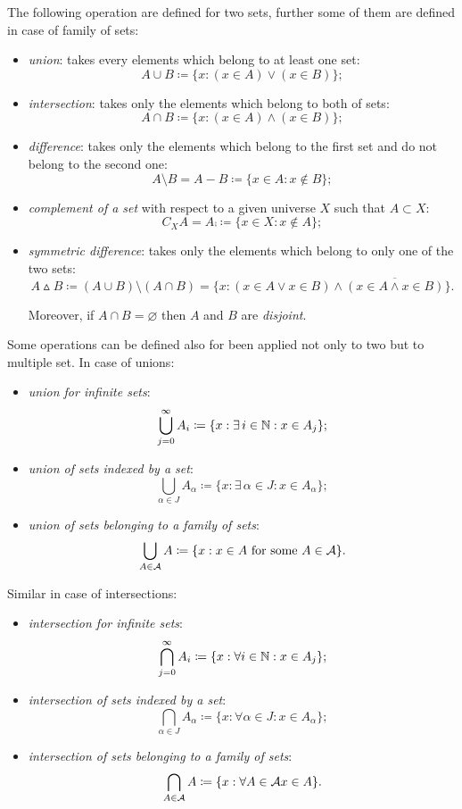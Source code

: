 \begin{defn}\label{main-set-operations}
	The following operation are defined for two sets, further some of them are defined in case of family of sets:
	\begin{itemize}
		\item \emph{union}: takes every elements which belong to at least one set:
		$$
			A \cup B 
			\coloneqq \{x : \left(x \in A\right) \vee \left(x \in B\right)\}
		;
		$$
		\item  \emph{intersection}: takes only the elements which belong to both of sets:
		$$
			A \cap B 
			\coloneqq \{x : \left(x \in A\right) \wedge \left(x \in B\right)\}
		;
		$$
		\item \emph{difference}:  takes only the elements which belong to the first set and do not belong to the second one:
		$$
			A \setminus B 
			= A - B 
			\coloneqq \{x \in A : x \notin B\}
		;
		$$
		\item \emph{complement of a set} with respect to a given universe $X$ such that $A\subset X$:
		$$
			C_X A 
			= A\comp 
			\coloneqq\{x\in X : x \notin A\}
		;
		$$
		\item \emph{symmetric difference}: takes only the elements which belong to only one of the two sets:
		$$
			A \vartriangle B
			\coloneqq \left(A\cup B\right)\setminus\left(A \cap B\right)
			=\{x: (x\in A \vee x \in B)	\wedge \overline{(x\in A \wedge x \in B)} \}
		.
		$$
		
		Moreover, if $A \cap B = \varnothing$ then $A$ and $B$ are \emph{disjoint}.
	\end{itemize}
\end{defn}



Some operations can be defined also for been applied not only to two but to multiple set. In case of unions:
\begin{itemize}
	\item \emph{union for infinite sets}:
	$$
		\bigcup_{j = 0}^\infty A_i 
		\coloneqq \{x : \exists \, i \in \mathbb N: x \in A_j\}
	;
	$$
	\item  \emph{union of sets indexed by a set}:
	$$
		\bigcup_{\alpha \in J} A_\alpha 
		\coloneqq \{x : \exists \, \alpha \in J: x \in A_\alpha\}
	;
	$$
	\item  \emph{union of sets belonging to a family of sets}:
	$$
		\bigcup_{A \in \mathcal A} A 
		\coloneqq \{x : x \in A \text{ for some } A \in \mathcal A\}
	.
	$$
\end{itemize}

Similar in case of intersections:
\begin{itemize}
	\item \emph{intersection for infinite sets}:
	$$
		\bigcap_{j = 0}^\infty A_i 
		\coloneqq \{x : \forall i \in \mathbb N: x \in A_j\}
	;
	$$
	\item  \emph{intersection of sets indexed by a set}:
	$$
		\bigcap_{\alpha \in J} A_\alpha 
		\coloneqq \{x : \forall \alpha \in J: x \in A_\alpha\}
	;
	$$
	\item  \emph{intersection of sets belonging to a family of sets}:
	$$
		\bigcap_{A \in \mathcal A} A 
		\coloneqq \{x : \forall A \in \mathcal A x \in A\}
	.
	$$
\end{itemize}

